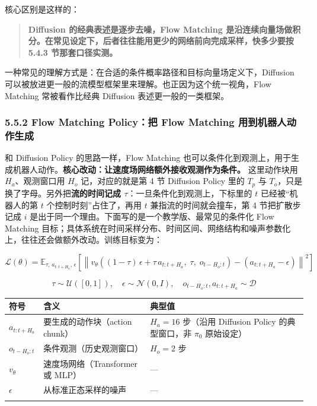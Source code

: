 \documentclass[
  chinese,
]{ctexart}
\begin{document}
核心区别是这样的：

\begin{quote}
\textbf{Diffusion 的经典表述是逐步去噪，Flow Matching
是沿连续向量场做积分。在常见设定下，后者往往能用更少的网络前向完成采样，快多少要按
5.4.3 节那套口径实测。}
\end{quote}

一种常见的理解方式是：在合适的条件概率路径和目标向量场定义下，Diffusion
可以被放进更一般的流模型框架里来理解。也正因为这个统一视角，Flow
Matching 常被看作比经典 Diffusion 表述更一般的一类框架。

\subsubsection{5.5.2 Flow Matching Policy：把 Flow Matching
用到机器人动作生成}\label{flow-matching-policyux628a-flow-matching-ux7528ux5230ux673aux5668ux4ebaux52a8ux4f5cux751fux6210}

和 Diffusion Policy 的思路一样，Flow Matching
也可以条件化到观测上，用于生成机器人动作。\textbf{核心改动：让速度场网络额外接收观测作为条件。}
这里动作块用 \(H_a\)、观测窗口用 \(H_o\) 记，对应的就是第 4 节 Diffusion
Policy 里的 \(T_p\) 与 \(T_o\)，只是换了字母。另外把\textbf{流的时间记成
\(\tau\)}：一旦条件化到观测上，下标里的 \(t\) 已经被``机器人的第 \(t\)
个控制时刻''占住了，再用 \(t\) 兼指流的时间就会撞车，第 4 节把扩散步记成
\(i\) 是出于同一个理由。下面写的是一个教学版、最常见的条件化 Flow
Matching
目标；具体系统在时间采样分布、时间区间、网络结构和噪声参数化上，往往还会做额外改动。训练目标变为：

\[
\mathcal{L}(\theta) = \mathbb{E}_{\tau,\, a_{t:t+H_a},\, \epsilon}\left[\left\| v_\theta\!\left((1-\tau)\, \epsilon + \tau\, a_{t:t+H_a},\; \tau,\; o_{t-H_o:t}\right) - (a_{t:t+H_a} - \epsilon)\right\|^2\right]
\]

\[
\tau \sim \mathcal{U}([0, 1]), \quad \epsilon \sim \mathcal{N}(0, I), \quad o_{t-H_o:t}, a_{t:t+H_a} \sim \mathcal{D}
\]

\begin{center}
\begin{tabular}{@{}>{\raggedright\arraybackslash}p{} >{\raggedright\arraybackslash}p{} >{\raggedright\arraybackslash}p{}@{}}
\toprule\noalign{}
符号 & 含义 & 典型值 \\
\midrule\noalign{}
\(a_{t:t+H_a}\) & 要生成的动作块（action chunk） & \(H_a = 16\) 步（沿用 Diffusion Policy 的典型窗口，非 \(\pi_0\) 原始设定） \\
\(o_{t-H_o:t}\) & 条件观测（历史观测窗口） & \(H_o = 2\) 步 \\
\(v_\theta\) & 速度场网络（Transformer 或 MLP） & --- \\
\(\epsilon\) & 从标准正态采样的噪声 & --- \\
\bottomrule\noalign{}
\end{tabular}
\end{center}
\end{document}
